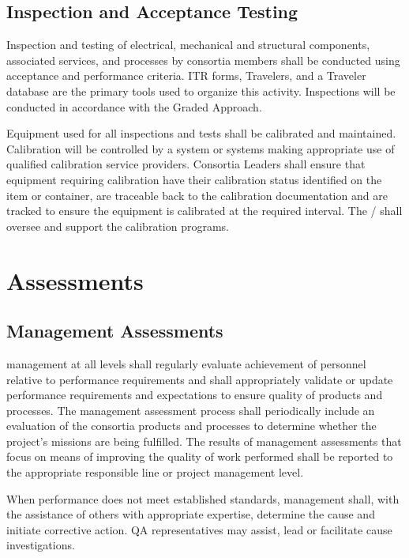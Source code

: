 \subsection{Inspection and Acceptance Testing}

Inspection and testing of electrical, mechanical and structural
components, associated services, and processes by consortia members
shall be conducted using acceptance and performance criteria. ITR
forms, Travelers, and a Traveler database are the primary tools used
to organize this activity. Inspections will be conducted in accordance
with the Graded Approach.

Equipment used for all inspections and tests shall be calibrated and
maintained. Calibration will be controlled by a system or systems
making appropriate use of qualified calibration service
providers. Consortia Leaders shall ensure that equipment requiring
calibration have their calibration status identified on the item or
container, are traceable back to the calibration documentation and are
tracked to ensure the equipment is calibrated at the required
interval. The /  shall oversee and
support the  calibration programs.

\section{Assessments}

\subsection{Management Assessments}

 management at all levels shall regularly evaluate achievement of
personnel relative to performance requirements and shall appropriately
validate or update performance requirements and expectations to ensure
quality of products and processes. The management assessment process
shall periodically include an evaluation of the consortia products
and processes to determine whether the project's missions are being
fulfilled. The results of management assessments that focus on means
of improving the quality of work performed shall be reported to the
appropriate responsible line or project management level.

When performance does not meet established standards, management
shall, with the assistance of others with appropriate expertise,
determine the cause and initiate corrective action. QA representatives
may assist, lead or facilitate cause investigations.

